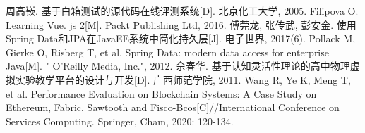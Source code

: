 \begin{thebibliography}{99}
周高嵚. 基于白箱测试的源代码在线评测系统[D]. 北京化工大学, 2005.
Filipova O. Learning Vue. js 2[M]. Packt Publishing Ltd, 2016.
傅莞龙, 张传武, 彭安金. 使用Spring Data和JPA在JavaEE系统中简化持久层[J]. 电子世界, 2017(6).
Pollack M, Gierke O, Risberg T, et al. Spring Data: modern data access for enterprise Java[M]. " O'Reilly Media, Inc.", 2012.
佘春华. 基于认知灵活性理论的高中物理虚拟实验教学平台的设计与开发[D]. 广西师范学院, 2011.
Wang R, Ye K, Meng T, et al. Performance Evaluation on Blockchain Systems: A Case Study on Ethereum, Fabric, Sawtooth and Fisco-Bcos[C]//International Conference on Services Computing. Springer, Cham, 2020: 120-134.

\end{thebibliography}

\endgroup
\clearpage
